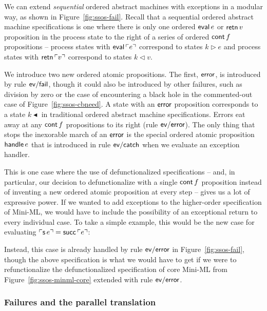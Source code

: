 We can extend {\it sequential} ordered abstract machines with
exceptions in a modular way, as shown in
Figure~\ref{fig:ssos-fail}. Recall that a sequential ordered abstract
machine specifications is one where there is only one ordered ${\sf
  eval}\,e$ or ${\sf retn}\,v$ proposition in the process state to the
right of a series of ordered ${\sf cont}\,f$ propositions -- process
states with ${\sf eval}\,{\ulcorner{e}\urcorner}$ correspond to states $k \rhd e$
and process states with ${\sf retn}\,{\ulcorner{v}\urcorner}$ correspond to states
$k \lhd v$. 

We introduce two new ordered atomic propositions. The first, ${\sf
  error}$, is introduced by rule ${\sf ev/fail}$, though it could also
be introduced by other failures, such as division by zero or the case
of encountering a black hole in the commented-out case of
Figure~\ref{fig:ssos-cbneed}. A state with an ${\sf error}$
proposition corresponds to a state $k{\blacktriangleleft}$ in
traditional ordered abstract machine specifications. Errors eat away
at any ${\sf cont}\,f$ propositions to its right (rule ${\sf
  ev/error}$). The only thing that stops the inexorable march of an
${\sf error}$ is the special ordered atomic proposition ${\sf
  handle}\,e$ that is introduced in rule ${\sf ev/catch}$ when we
evaluate an exception handler.

This is one case where the use of defunctionalized specifications --
and, in particular, our decision to defunctionalize with a single
${\sf cont}\,f$ proposition instead of inventing a new ordered atomic
proposition at every step -- gives us a lot of expressive power. If we
wanted to add exceptions to the higher-order specification of Mini-ML,
we would have to include the possibility of an exceptional return to
every individual case. To take a simple example, this would be the new
case for evaluating ${\ulcorner{{\sf s}\,e}\urcorner} = {\sf succ}\,{\ulcorner{e}\urcorner}$:


\noindent
Instead, this case is already handled by rule ${\sf ev/error}$ in
Figure~\ref{fig:ssos-fail}, though the above specification is what we
would have to get if we were to refunctionalize the defunctionalized
specification of core Mini-ML from Figure~\ref{fig:ssos-minml-core}
extended with rule ${\sf ev/error}$.

\subsubsection{Failures and the parallel translation}

